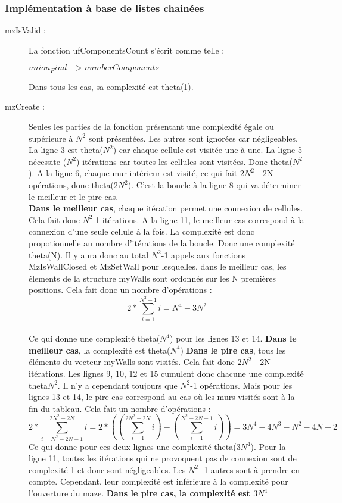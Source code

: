 \documentclass[11pt]{article}
\begin{document}
\subsubsection{Implémentation à base de listes chainées}
\begin{description}
\item[mzIsValid :]La fonction ufComponentsCount s'écrit comme telle :
\begin{codebox}
\li \Return $union_Find->numberComponents$
\end{codebox}
Dans tous les cas, sa complexité est theta(1).

\item[mzCreate :] Seules les parties de la fonction présentant une complexité égale ou supérieure à $N^{2}$ sont présentées. Les autres sont ignorées car négligeables. La ligne 3 est theta($N^{2}$) car chaque cellule est visitée une à une. La ligne 5 nécessite ($N^{2}$) itérations car toutes les cellules sont visitées. Donc theta($N^{2}$).
A la ligne 6, chaque mur intérieur est visité, ce qui fait 2$N^{2}$ - 2N opérations, donc theta(2$N^{2}$).
C'est la boucle à la ligne 8 qui va déterminer le meilleur et le pire cas. \\
\textbf{Dans le meilleur cas}, chaque itération permet une connexion de cellules. Cela fait donc $N^{2}$-1 itérations. A la ligne 11, le meilleur cas correspond à la connexion d'une seule cellule à la fois. La complexité est donc propotionnelle au nombre d'itérations de la boucle.  Donc une complexité theta(N).
Il y aura donc au total $N^{2}$-1 appels aux fonctions MzIsWallClosed et MzSetWall pour lesquelles, dans le meilleur cas, les élements de la structure myWalls sont ordonnés sur les N premières positions.
Cela fait donc un nombre d'opérations : \\
\begin{equation}
 2 * \sum\limits_{i=1}^{N^{2}-1} i = N^{4} - 3N^{2}
\end{equation}
\\Ce qui donne une complexité theta($N^{4}$) pour les lignes 13 et 14. \textbf{Dans le meilleur cas}, la complexité est theta($N^{4}$)
\textbf{Dans le pire cas}, tous les éléments du vecteur myWalls sont visités. Cela fait donc 2$N^{2}$ - 2N  itérations. Les lignes 9, 10, 12 et 15 cumulent donc chacune une complexité theta{$N^{2}$}. Il n'y a cependant toujours que $N^{2}$-1 opérations. Mais pour les lignes 13 et 14, le pire cas correspond au cas où les murs visités sont à la fin du tableau. Cela fait un nombre d'opérations :
\begin{equation}
 2 * \sum\limits_{i=N^{2}-2N-1}^{2N^{2}-2N} i = 2 * ((\sum\limits_{i=1}^{2N^{2}-2N} i) - (\sum\limits_{i=1}^{N^{2}-2N -1} i)) = 3N^{4} - 4N^{3} - N^{2} - 4N -2
\end{equation}
Ce qui donne pour ces deux lignes une complexité theta($3N^{4}$). Pour la ligne 11, toutes les itérations qui ne provoquent pas de connexion sont de complexité 1 et donc sont négligeables. Les $N^{2}$ -1 autres sont à prendre en compte. Cependant, leur complexité est inférieure à la complexité pour l'ouverture du maze.
\textbf{Dans le pire cas, la complexité est $3N^{4}$}
\end{description}
\end{document}
